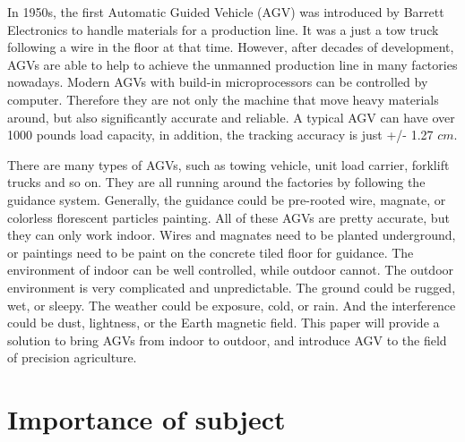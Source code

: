 \documentclass[letterpaper,12pt,oneside]{book}
\begin{document}
		In 1950s, the first Automatic Guided Vehicle (AGV) was introduced by Barrett Electronics to handle materials for a production line. \cite{olmi2011traffic} It was a just a tow truck following a wire in the floor at that time. However, after decades of development, AGVs are able to help to achieve the unmanned production line in many factories nowadays. Modern AGVs with build-in microprocessors can be controlled by computer. Therefore they are not only the machine that move heavy materials around, but also significantly accurate and reliable. A typical AGV can have over 1000 pounds load capacity, in addition, the tracking accuracy is just +/- 1.27 $cm$. \cite{KESH} 
		
		There are many types of AGVs, such as towing vehicle, unit load carrier, forklift trucks and so on. They are all running around the factories by following the guidance system. Generally, the guidance could be pre-rooted wire, magnate, or colorless florescent particles painting. All of these AGVs are pretty accurate, but they can only work indoor. Wires and magnates need to be planted underground, or paintings need to be paint on the concrete tiled floor for guidance. The environment of indoor can be well controlled, while outdoor cannot. The outdoor environment is very complicated and unpredictable. The ground could be rugged, wet, or sleepy. The weather could be exposure, cold, or rain. And the interference could be dust, lightness, or the Earth magnetic field. This paper will provide a solution to bring AGVs from indoor to outdoor, and introduce AGV to the field of precision agriculture.
		
		\section{Importance of subject}
		
\end{document}
